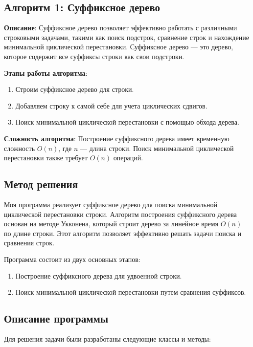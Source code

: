 \documentclass[12pt]{article}
\begin{document}
\subsection*{Алгоритм 1: Суффиксное дерево}

\textbf{Описание}: Суффиксное дерево позволяет эффективно работать с различными строковыми задачами, такими как поиск подстрок, сравнение строк и нахождение минимальной циклической перестановки. Суффиксное дерево — это дерево, которое содержит все суффиксы строки как свои подстроки.

\textbf{Этапы работы алгоритма}:
\begin{enumerate}
    \item Строим суффиксное дерево для строки.
    \item Добавляем строку к самой себе для учета циклических сдвигов.
    \item Поиск минимальной циклической перестановки с помощью обхода дерева.
\end{enumerate}

\textbf{Сложность алгоритма}: Построение суффиксного дерева имеет временную сложность $O(n)$, где $n$ — длина строки. Поиск минимальной циклической перестановки также требует $O(n)$ операций.
\subsection*{Метод решения}

Моя программа реализует суффиксное дерево для поиска минимальной циклической перестановки строки. Алгоритм построения суффиксного дерева основан на методе Укконена, который строит дерево за линейное время $O(n)$ по длине строки. Этот алгоритм позволяет эффективно решать задачи поиска и сравнения строк.

Программа состоит из двух основных этапов:
\begin{enumerate}
    \item Построение суффиксного дерева для удвоенной строки.
    \item Поиск минимальной циклической перестановки путем сравнения суффиксов.
\end{enumerate}

\subsection*{Описание программы}

Для решения задачи были разработаны следующие классы и методы:
\end{document}
